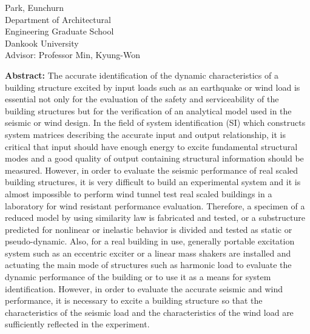 \begin{center}
\end{center}
\begin{flushright}
Park, Eunchurn\\
Department of Architectural\\
Engineering Graduate School\\
Dankook University\\
\vspace{0.3cm}
Advisor: Professor Min, Kyung-Won
\end{flushright}
{\large\textbf{Abstract:}}
The accurate identification of the dynamic characteristics of a building structure excited by input loads such as an earthquake or wind load is essential not only for the evaluation of the safety and serviceability of the building structures but for the verification of an analytical model used in the seismic or wind design. In the field of system identification (SI) which constructs system matrices describing the accurate input and output relationship, it is critical that input should have enough energy to excite fundamental structural modes and a good quality of output containing structural information should be measured. However, in order to evaluate the seismic performance of real scaled building structures, it is very difficult to build an experimental system and it is almost impossible to perform wind tunnel test real scaled buildings in a laboratory for wind resistant performance evaluation. Therefore, a specimen of a reduced model by using similarity law is fabricated and tested, or a substructure predicted for nonlinear or inelastic behavior is divided and tested as static or pseudo-dynamic. Also, for a real building in use, generally portable excitation system such as an eccentric exciter or a linear mass shakers are installed and actuating the main mode of structures such as harmonic load to evaluate the dynamic performance of the building or to use it as a means for system identification. However, in order to evaluate the accurate seismic and wind performance, it is necessary to excite a building structure so that the characteristics of the seismic load and the characteristics of the wind load are sufficiently reflected in the experiment.

